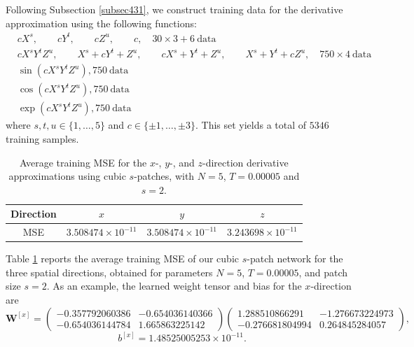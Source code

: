 \documentclass[pdflatex,sn-mathphys-num]{sn-jnl}%
\theoremstyle{thmstyleone}%
\theoremstyle{thmstyletwo}%
\theoremstyle{thmstylethree}%
\begin{document}
{Following Subsection \ref{subsec431}, we construct training data for the  derivative approximation  using the following functions:
\begin{align*}
&cX^s,\quad \quad  cY^t,\quad \quad  cZ^u,\quad \quad   c,\quad 30\times 3+6\ \text{data} \\
&cX^s Y^t Z^u,\quad \quad X^s + cY^t+Z^u, \quad \quad cX^s + Y^t+Z^u, \quad \quad X^s + Y^t+cZ^u,\quad 750\times 4\ \text{data}\\
&\sin(cX^s Y^t Z^u), 750\ \text{data} \\%
&\cos(cX^s Y^t Z^u), 750\ \text{data} \\ %
&\exp(cX^s Y^t Z^u), 750\ \text{data} %
\end{align*}
where
$s,t,u \in \{1,\dots,5\}$ and $ c\in \{\pm1,\dots,\pm3\}.$ This set yields a total of $5346$ training samples.


\begin{table}[ht]
\centering
\caption{Average training MSE for the $x$-, $y$-, and $z$-direction derivative approximations using cubic $s$-patches, with $N=5$, $T=0.00005$ and $s=2$.}
\begin{tabular}{cccc}
\hline
Direction & $x$ & $y$ & $z$ \\
\hline
MSE & $3.508474\times 10^{-11}$ & $3.508474\times 10^{-11}$ & $3.243698\times 10^{-11}$ \\
\hline
\end{tabular}
\label{tab:9}
\end{table}

Table \ref{tab:9} reports the average training MSE of our cubic $s$-patch network for the three spatial directions, obtained for parameters $N=5$, $T=0.00005$, and patch size $s=2$. 
As an example, the learned weight tensor and bias for the $x$-direction are
\[
\boldsymbol{W}^{[x]}=
\begin{pmatrix}
-0.357792060386 & -0.654036140366 \\
-0.654036144784 &  1.665863225142
\end{pmatrix}
\begin{pmatrix}
  1.288510866291    & -1.276673224973 \\
-0.276681804994 &      0.264845284057
\end{pmatrix},\]
\[
b^{[x]} = 1.48525005253\times 10^{-11}.
\]

}
\end{document}
